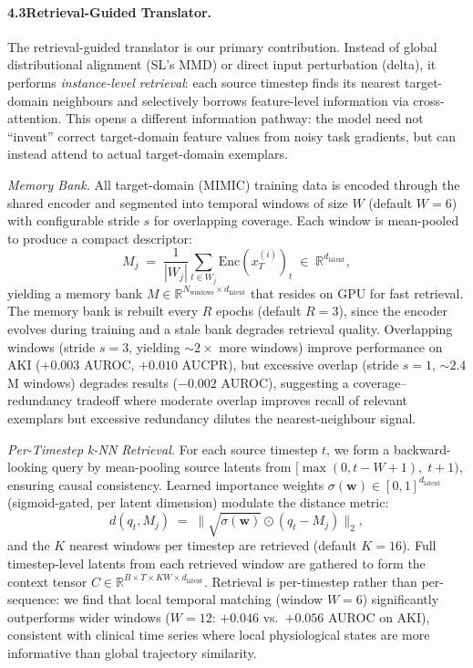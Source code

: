 \paragraph{4.3\quad Retrieval-Guided Translator.}
\label{sec:retrieval}
The retrieval-guided translator is our primary contribution.
Instead of global distributional alignment (SL's MMD) or direct input perturbation (delta), it performs \emph{instance-level retrieval}: each source timestep finds its nearest target-domain neighbours and selectively borrows feature-level information via cross-attention.
This opens a different information pathway: the model need not ``invent'' correct target-domain feature values from noisy task gradients, but can instead attend to actual target-domain exemplars.

\vspace{0.3em}
\noindent\textit{Memory Bank.}\quad
All target-domain (MIMIC) training data is encoded through the shared encoder and segmented into temporal windows of size $W$ (default $W{=}6$) with configurable stride $s$ for overlapping coverage.
Each window is mean-pooled to produce a compact descriptor:
\begin{equation}
\label{eq:memory}
M_j \;=\; \frac{1}{|W_j|} \sum_{t \in W_j} \mathrm{Enc}(x_T^{(i)})_t \;\in\; \mathbb{R}^{d_{\mathrm{latent}}},
\end{equation}
yielding a memory bank $M \in \mathbb{R}^{N_{\mathrm{windows}} \times d_{\mathrm{latent}}}$ that resides on GPU for fast retrieval.
The memory bank is rebuilt every $R$ epochs (default $R{=}3$), since the encoder evolves during training and a stale bank degrades retrieval quality.
Overlapping windows (stride $s{=}3$, yielding ${\sim}2\times$ more windows) improve performance on AKI ($+0.003$ AUROC, $+0.010$ AUCPR), but excessive overlap (stride $s{=}1$, ${\sim}2.4$M windows) degrades results ($-0.002$ AUROC), suggesting a coverage--redundancy tradeoff where moderate overlap improves recall of relevant exemplars but excessive redundancy dilutes the nearest-neighbour signal.

\vspace{0.3em}
\noindent\textit{Per-Timestep k-NN Retrieval.}\quad
For each source timestep $t$, we form a backward-looking query by mean-pooling source latents from $[\max(0, t{-}W{+}1),\; t{+}1)$, ensuring causal consistency.
Learned importance weights $\sigma(\mathbf{w}) \in [0,1]^{d_{\mathrm{latent}}}$ (sigmoid-gated, per latent dimension) modulate the distance metric:
\begin{equation}
\label{eq:retrieval_dist}
d(q_t, M_j) \;=\; \bigl\|\sqrt{\sigma(\mathbf{w})} \odot (q_t - M_j)\bigr\|_2,
\end{equation}
and the $K$ nearest windows per timestep are retrieved (default $K{=}16$).
Full timestep-level latents from each retrieved window are gathered to form the context tensor $C \in \mathbb{R}^{B \times T \times KW \times d_{\mathrm{latent}}}$.
Retrieval is per-timestep rather than per-sequence: we find that local temporal matching (window $W{=}6$) significantly outperforms wider windows ($W{=}12$: $+0.046$ vs.\ $+0.056$ AUROC on AKI), consistent with clinical time series where local physiological states are more informative than global trajectory similarity.

